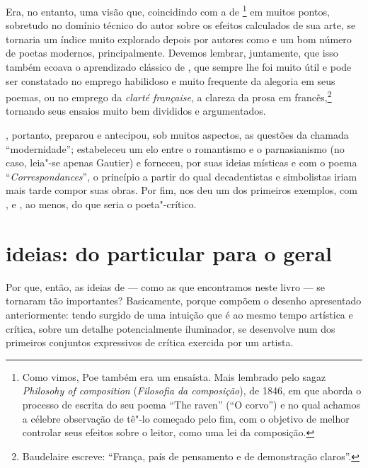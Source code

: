 Era, no entanto, uma visão que, coincidindo com a de \footnote{ Como 
vimos, Poe também era um ensaísta. Mais lembrado
pelo sagaz \textit{Philosohy of composition} (\textit{Filosofia da composição}),
de 1846, em que aborda o processo de escrita do seu poema ``The raven”
(``O corvo'') e no qual achamos a célebre observação de tê"-lo começado pelo
fim, com o objetivo de melhor controlar seus efeitos sobre o leitor,
como uma lei da composição.} em muitos pontos, sobretudo no domínio
técnico do autor sobre os efeitos calculados de sua arte, se tornaria
um índice muito explorado depois por autores como  e um bom
número de poetas modernos, principalmente. Devemos lembrar, juntamente,
que isso também ecoava o aprendizado clássico de , que sempre
lhe foi muito útil e pode ser constatado no emprego habilidoso e muito
frequente da alegoria em seus poemas, ou no emprego da \textit{clarté
française}, a clareza da prosa em francês,\footnote{ Baudelaire escreve:
“França, país de pensamento e de demonstração claros”.} tornando seus	
ensaios muito bem divididos e argumentados.

, portanto, preparou e antecipou, sob muitos aspectos, as
questões da chamada “modernidade”; estabeleceu um elo entre o
romantismo e o parnasianismo (no caso, leia"-se apenas %
{Gautier}) e forneceu, por suas ideias místicas e com o poema
“\textit{Correspondances}”, o princípio a partir do qual decadentistas e
simbolistas iriam mais tarde compor suas obras. Por fim, nos deu um dos
primeiros exemplos, com ,  e , 
ao menos, do que seria o poeta"-crítico. 

\section{ideias: do particular para o geral}
Por que, então, as ideias de  --- como as que encontramos
neste livro --- se tornaram tão importantes? Basicamente, porque
compõem o desenho apresentado anteriormente: tendo surgido de uma intuição que
é ao mesmo tempo artística e crítica, sobre um detalhe potencialmente
iluminador, se desenvolve num dos primeiros conjuntos expressivos de
crítica exercida por um artista. 

